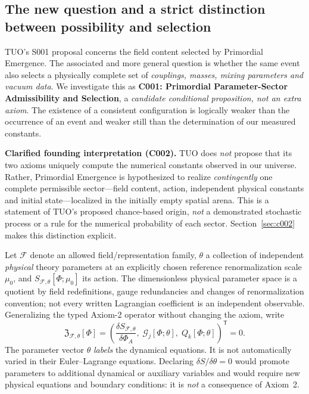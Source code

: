 \documentclass[11pt,a4paper]{article}
\theoremstyle{tmon}
\theoremstyle{definition}
\begin{document}
\subsection{The new question and a strict distinction between possibility and selection}
TUO's S001 proposal concerns the field content selected by Primordial Emergence. The associated and more general question is whether the same event also selects a physically complete set of \emph{couplings, masses, mixing parameters and vacuum data}. We investigate this as \textbf{C001: Primordial Parameter-Sector Admissibility and Selection}, a \emph{candidate conditional proposition, not an extra axiom}. The existence of a consistent configuration is logically weaker than the occurrence of an event and weaker still than the determination of our measured constants.

\textbf{Clarified founding interpretation (C002).} TUO does \emph{not} propose that its two axioms uniquely compute the numerical constants observed in our universe. Rather, Primordial Emergence is hypothesized to realize \emph{contingently} one complete permissible sector---field content, action, independent physical constants and initial state---localized in the initially empty spatial arena. This is a statement of TUO's proposed chance-based origin, \emph{not} a demonstrated stochastic process or a rule for the numerical probability of each sector. Section~\ref{sec:c002} makes this distinction explicit.

Let $\mathscr F$ denote an allowed field/representation family, $\theta$ a collection of independent \emph{physical} theory parameters at an explicitly chosen reference renormalization scale $\mu_0$, and $S_{\mathscr F,\theta}[\Phi;\mu_0]$ its action. The dimensionless physical parameter space is a quotient by field redefinitions, gauge redundancies and changes of renormalization convention; not every written Lagrangian coefficient is an independent observable. Generalizing the typed Axiom-2 operator without changing the axiom, write
\begin{equation}\label{eq:c001family}
\mathfrak Z_{\mathscr F,\theta}[\Phi]
=\left(\frac{\delta S_{\mathscr F,\theta}}{\delta\Phi_A},\;\mathcal G_j[\Phi;\theta],\;Q_k[\Phi;\theta]\right)^\mathsf T=0.
\end{equation}
The parameter vector $\theta$ \emph{labels} the dynamical equations. It is not automatically varied in their Euler--Lagrange equations. Declaring $\delta S/\delta\theta=0$ would promote parameters to additional dynamical or auxiliary variables and would require new physical equations and boundary conditions: it is \emph{not} a consequence of Axiom~2.
\end{document}
